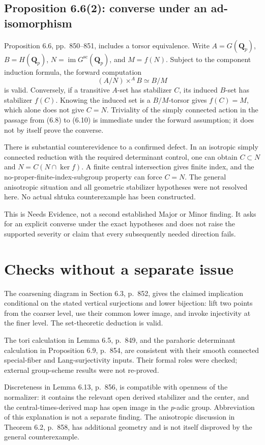 \documentclass[10pt]{article}
\begin{document}
\subsection*{Proposition 6.6(2): converse under an ad-isomorphism}
Proposition 6.6, pp. 850–851, includes a torsor equivalence. Write \(A=G(\mathbf Q_p)\), \(B=H(\mathbf Q_p)\), \(N=\operatorname{im}G^{\mathrm{sc}}(\mathbf Q_p)\), and \(M=f(N)\). Subject to the component induction formula, the forward computation \[(A/N)\times^A B \simeq B/M\] is valid. Conversely, if a transitive \(A\)-set has stabilizer \(C\), its induced \(B\)-set has stabilizer \(f(C)\). Knowing the induced set is a \(B/M\)-torsor gives \(f(C)=M\), which alone does not give \(C=N\). Triviality of the simply connected action in the passage from (6.8) to (6.10) is immediate under the forward assumption; it does not by itself prove the converse.\par
There is substantial counterevidence to a confirmed defect. In an isotropic simply connected reduction with the required determinant control, one can obtain \(C\subset N\) and \(N=C(N\cap\ker f)\). A finite central intersection gives finite index, and the no-proper-finite-index-subgroup property can force \(C=N\). The general anisotropic situation and all geometric stabilizer hypotheses were not resolved here. No actual shtuka counterexample has been constructed.\par
This is Needs Evidence, not a second established Major or Minor finding. It asks for an explicit converse under the exact hypotheses and does not raise the supported severity or claim that every subsequently needed direction fails.\par
\section*{Checks without a separate issue}
The coarsening diagram in Section 6.3, p. 852, gives the claimed implication conditional on the stated vertical surjections and lower bijection: lift two points from the coarser level, use their common lower image, and invoke injectivity at the finer level. The set-theoretic deduction is valid.\par
The tori calculation in Lemma 6.5, p. 849, and the parahoric determinant calculation in Proposition 6.9, p. 854, are consistent with their smooth connected special-fiber and Lang-surjectivity inputs. Their formal roles were checked; external group-scheme results were not re-proved.\par
Discreteness in Lemma 6.13, p. 856, is compatible with openness of the normalizer: it contains the relevant open derived stabilizer and the center, and the central-times-derived map has open image in the \(p\)-adic group. Abbreviation of this explanation is not a separate finding. The anisotropic discussion in Theorem 6.2, p. 858, has additional geometry and is not itself disproved by the general counterexample.\par
\end{document}
